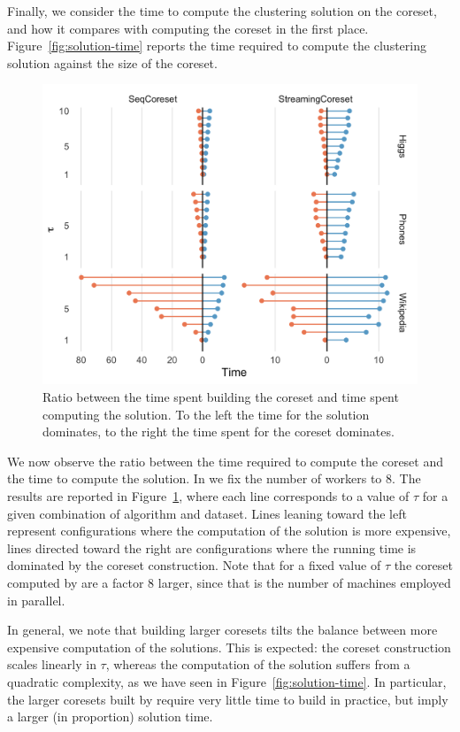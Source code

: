 Finally, we consider the time to compute the clustering solution on the coreset, and 
how it compares with computing the coreset in the first place.
Figure~\ref{fig:solution-time} reports the time required to compute the clustering
solution against the size of the coreset.

\begin{figure}
    \includegraphics[width=\columnwidth]{time-ratio.png}
    \caption{
        \label{fig:time-ratio}
        Ratio between the time spent building the coreset and time spent computing the solution.
        To the left the time for the solution dominates, to the right the time spent for the
        coreset dominates.
    }
\end{figure}
We now observe the ratio between the time required to compute the coreset and the time to compute the 
solution.
In \mapr we fix the number of workers to 8.
The results are reported in Figure~\ref{fig:time-ratio}, where each line corresponds to a value of $\tau$
for a given combination of algorithm and dataset.
Lines leaning toward the left represent configurations where the computation of the solution is more expensive,
lines directed toward the right are configurations where the running time is dominated by the coreset construction.
Note that for a fixed value of $\tau$ the coreset computed by \mapr are a factor 8 larger, since that is the number
of machines employed in parallel.

In general, we note that building larger coresets tilts the balance between more expensive 
computation of the solutions. This is expected: the coreset construction scales linearly in $\tau$,
whereas the computation of the solution suffers from a quadratic complexity, as we have 
seen in Figure~\ref{fig:solution-time}.
In particular, the larger coresets built by \mapr require very little time to build in practice,
but imply a larger (in proportion) solution time.

